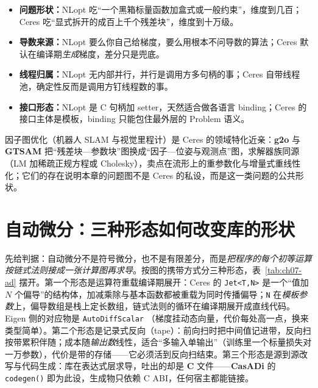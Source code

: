 \documentclass[12pt,a4paper,fontset=fandol]{ctexbook}
\newcommand{\Fn}[1]{\texttt{#1()}}
\newcommand{\Tp}[1]{\texttt{#1}}
\newcommand{\Bk}{\allowbreak}
\newcommand{\Lib}[1]{\textbf{#1}}
\newcommand{\Lang}[1]{\textsf{\bfseries #1}}
\newcommand{\CL}{\Lang{C}}
\begin{document}
\begin{compare}[title={NLopt 与 Ceres：两条不相交的供给线}]
\begin{itemize}
\item \textbf{问题形状：}NLopt 吃``一个黑箱标量函数加盒式或一般约束''，维度到几百；Ceres 吃``显式拆开的成百上千个残差块''，维度到十万级。
\item \textbf{导数来源：}NLopt 要么你自己给梯度，要么用根本不问导数的算法；Ceres 默认在编译期\emph{生成}梯度，差分只是兜底。
\item \textbf{线程归属：}NLopt 无内部并行，并行是调用方多句柄的事；Ceres 自带线程池，确定性反而是调用方钉线程数的事。
\item \textbf{接口形态：}NLopt 是 C 句柄加 setter，天然适合做各语言 binding；Ceres 的接口主体是模板，binding 只能包住最外层的 Problem 语义。
\end{itemize}
\end{compare}

因子图优化（机器人 SLAM 与视觉里程计）是 Ceres 的领域特化近亲：\Lib{g2o} 与 \Lib{GTSAM} 把``残差块—参数块''图换成``因子—位姿与观测点''图，求解器族同源（LM 加稀疏正规方程或 Cholesky），卖点在流形上的重参数化与增量式重线性化；它们的存在说明本章的问题图不是 Ceres 的私设，而是这一类问题的公共形状。

\section{自动微分：三种形态如何改变库的形状}\label{sec:ch07-ad}

先给判据：自动微分不是符号微分，也不是有限差分，而是\emph{把程序的每个初等运算按链式法则接成一张计算图再求导}。按图的携带方式分三种形态，表~\ref{tab:ch07-ad} 摆开。第一个形态是运算符重载编译期展开：Ceres 的 \Tp{Jet<T,N>} \Bk{} 是一个``值加 $N$ 个偏导''的结构体，加减乘除与基本函数都被重载为同时传播偏导；\Tp{N} 在\emph{模板参数}上，偏导数组是栈上定长数组，链式法则的循环在编译期展开成直线代码。Eigen 侧的对应物是 \Tp{AutoDiffScalar} \Bk{}（梯度挂动态向量，代价每处高一点，换来类型简单）。第二个形态是记录式反向（tape）：前向扫时把中间值记进带，反向扫按带累积伴随；成本随\emph{输出数}线性，适合``多输入单输出''（训练里一个标量损失对一万参数），代价是带的存储——它必须活到反向扫结束。第三个形态是源到源改写与代码生成：库在表达式层求导，吐出的却是 \CL{} 文件——\Lib{CasADi} \Bk{} 的 \Fn{codegen} \Bk{} 即为此设，生成物只依赖 C ABI，任何宿主都能链接。
\end{document}
